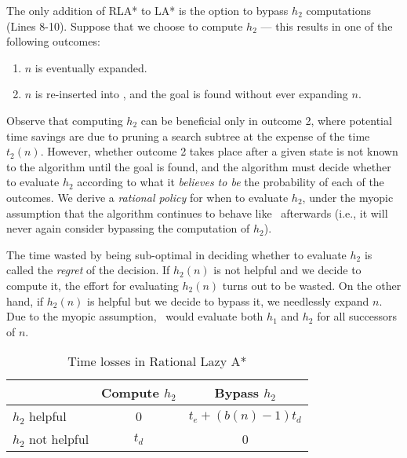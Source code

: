 The only addition of RLA* to LA* is the option to bypass $h_2$ computations (Lines 8-10).
Suppose that we choose to compute $h_2$ --- this results in one of the
following outcomes:
\begin{enumerate}
\item $n$ is eventually expanded.
\item $n$ is re-inserted into \OPEN, and the goal is found without ever expanding $n$.
\end{enumerate}

Observe that computing $h_2$ can be beneficial only in outcome 2, where
potential time savings are due to pruning a search subtree at the expense of
the time $t_2(n)$. However, whether outcome 2 takes place after a given state
is not known to the algorithm until the goal is found, and the algorithm must
decide whether to evaluate $h_2$ according to what it \textit{believes to be}
the probability of each of the outcomes. We derive a \textit{rational policy}
for when to evaluate $h_2$, under the myopic assumption that the algorithm
continues to behave like \lazyastar~afterwards (i.e., it will never again
consider bypassing the computation of $h_2$).

The time wasted by being sub-optimal in deciding whether to evaluate $h_2$ is
called the {\em regret} of the decision. If $h_2(n)$ is not helpful and we decide to compute it, the effort for evaluating $h_2(n)$ turns out to be wasted. On the other hand, if $h_2(n)$ is helpful but we decide to bypass it, we needlessly expand $n$. Due to the myopic assumption, \rationallazyastar~would evaluate both $h_1$ and $h_2$ for all successors of
$n$.

\begin{table}[t]
\begin{small}
\begin{center}
\begin{tabular}{|l|c|c|}
\hline
               & Compute $h_2$ & Bypass $h_2$\\
\hline
$h_2$ helpful &   0            & $t_e+(b(n)-1)t_d$\\
\hline
$h_2$ not helpful & $t_d$      & 0 \\
\hline
\end{tabular}
\end{center}
\end{small}\vspace{-0.2cm}
\caption{Time losses in Rational Lazy A*}
\label{tbl:rational-lazy-a-time}
\end{table}

